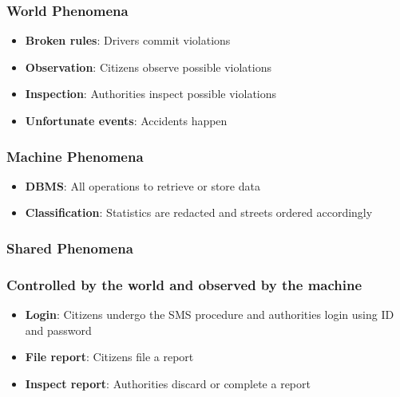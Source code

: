 \subsubsection{World Phenomena}

\begin{itemize}

\item \textbf{Broken rules}: Drivers commit violations

\item \textbf{Observation}: Citizens observe possible violations

\item \textbf{Inspection}: Authorities inspect possible violations 

\item \textbf{Unfortunate events}: Accidents happen

\end{itemize}

\subsubsection{Machine Phenomena}

\begin{itemize}

\item \textbf{DBMS}: All operations to retrieve or store data

\item \textbf{Classification}: Statistics are redacted and streets ordered accordingly

\end{itemize}

\subsubsection{Shared Phenomena}

\subsubsection*{Controlled by the world and observed by the machine}

\begin{itemize}

\item \textbf{Login}: Citizens undergo the SMS procedure and authorities login using ID and password

\item \textbf{File report}: Citizens file a report

\item \textbf{Inspect report}: Authorities discard or complete a report

\end{itemize}

